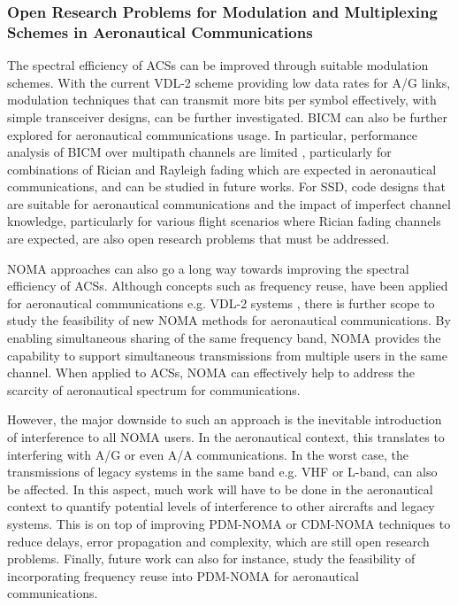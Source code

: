 \subsubsection{Open Research Problems for Modulation and Multiplexing Schemes in Aeronautical Communications}

The spectral efficiency of ACSs can be improved through suitable modulation schemes. With the current VDL-2 scheme providing low data rates for A/G links, modulation techniques that can transmit more bits per symbol effectively, with simple transceiver designs, can be further investigated. BICM can also be further explored for aeronautical communications usage. In particular, performance analysis of BICM over multipath channels are limited \cite{zhan2017differential}, particularly for combinations of Rician and Rayleigh fading which are expected in aeronautical communications, and can be studied in future works. For SSD, code designs that are suitable for aeronautical communications and the impact of imperfect channel knowledge, particularly for various flight scenarios where Rician fading channels are expected, are also open research problems that must be addressed.

NOMA approaches can also go a long way towards improving the spectral efficiency of ACSs. Although concepts such as frequency reuse, have been applied for aeronautical communications e.g. VDL-2 systems \cite{ribeiro2014framework}, there is further scope to study the feasibility of new NOMA methods for aeronautical communications. By enabling simultaneous sharing of the same frequency band, NOMA provides the capability to support simultaneous transmissions from multiple users in the same channel. When applied to ACSs, NOMA can effectively help to address the scarcity of aeronautical spectrum for communications. 

However, the major downside to such an approach is the inevitable introduction of interference to all NOMA users. In the aeronautical context, this translates to interfering with A/G or even A/A communications. In the worst case, the transmissions of legacy systems in the same band e.g. VHF or L-band, can also be affected. In this aspect, much work will have to be done in the aeronautical context to quantify potential levels of interference to other aircrafts and legacy systems. This is on top of improving PDM-NOMA or CDM-NOMA techniques to reduce delays, error propagation and complexity, which are still open research problems. Finally, future work can also for instance, study the feasibility of incorporating frequency reuse into PDM-NOMA for aeronautical communications.

